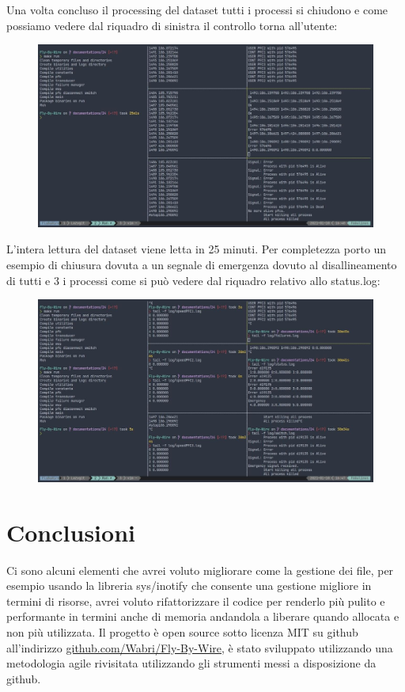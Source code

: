 \documentclass{article}
\begin{document}
\begin{flushleft}
Una volta concluso il processing del dataset tutti i processi si chiudono e come possiamo vedere dal riquadro di sinistra il controllo torna all'utente:

\begin{figure}[H]
\centering
\includegraphics[width=0.8\linewidth]{images/quarta.jpg}
\end{figure}

L'intera lettura del dataset viene letta in 25 minuti. Per completezza porto un esempio di chiusura dovuta a un segnale di emergenza dovuto al disallineamento di tutti e 3 i processi come si può vedere dal riquadro relativo allo status.log:

\begin{figure}[H]
\centering
\includegraphics[width=0.8\linewidth]{images/quinta.jpg}
\end{figure}

\section{Conclusioni}

Ci sono alcuni elementi che avrei voluto migliorare come la gestione dei file, per esempio usando la libreria sys/inotify che consente una gestione migliore in termini di risorse, avrei voluto rifattorizzare il codice per renderlo più pulito e performante in termini anche di memoria andandola a liberare quando allocata e non più utilizzata. Il progetto è open source sotto licenza MIT su github all'indirizzo \href{https://github.com/Wabri/Fly-By-Wire}{github.com/Wabri/Fly-By-Wire}, è stato sviluppato utilizzando una metodologia agile rivisitata utilizzando gli strumenti messi a disposizione da github.

\end{flushleft}
\end{document}
